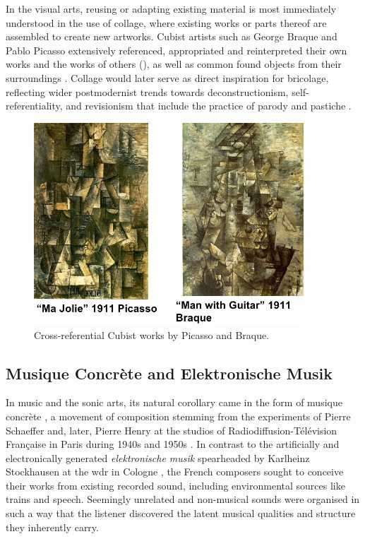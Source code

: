 In the visual arts, reusing or adapting existing material is most immediately understood in the use of collage, where existing works or parts thereof are assembled to create new artworks. Cubist artists such as George Braque and Pablo Picasso extensively referenced, appropriated and reinterpreted their own works and the works of others (), as well as common found objects from their surroundings \citep{Greenberg1971}. Collage would later serve as direct inspiration for bricolage, reflecting wider postmodernist trends towards deconstructionism, self-referentiality,  and revisionism that include the practice of parody and pastiche \citep{Lochhead2002}. 

\begin{figure}
	\begin{center}
		\includegraphics[width=0.9\textwidth]{ch04_sota/figures/picasso.png}
	\end{center}
	\caption[Cross-Referential Cubist Works by Picasso and Braque]{Cross-referential Cubist works by Picasso and Braque.}
	\label{fig:picasso}
\end{figure}
\subsection{Musique Concrète and Elektronische Musik}

In music and the sonic arts, its natural corollary came in the form of musique concrète \citep{Holmes2008}, a movement of composition stemming from the experiments of Pierre Schaeffer and, later, Pierre Henry at the studios of Radiodiffusion-Télévision Française in Paris during 1940s and 1950s \citep{Battier2007a}. In contrast to the artificially and electronically generated \textit{elektronische musik} spearheaded by Karlheinz Stockhausen at the \acrshort{wdr} in Cologne \citep{Collins2011a, Bates2009}, the French composers sought to conceive their works from existing recorded sound, including environmental sources like trains and speech. Seemingly unrelated and non-musical sounds were organised in such a way that the listener discovered the latent musical qualities and structure they inherently carry.

